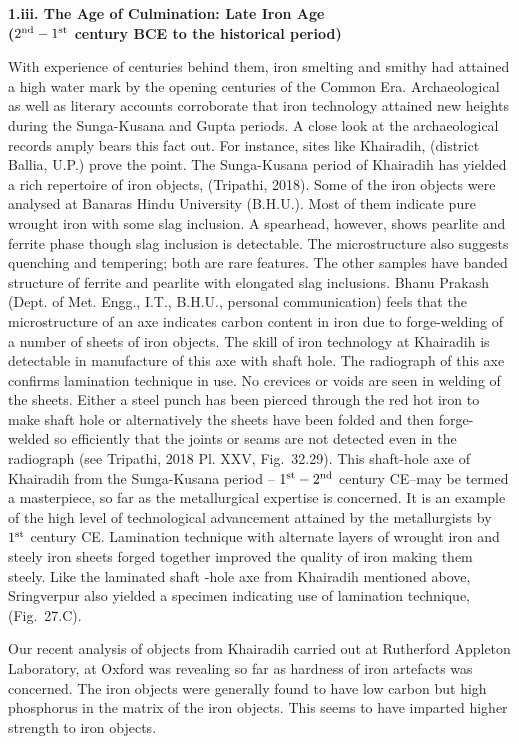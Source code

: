 \textbf{\large 1.iii. The Age of Culmination: Late Iron Age\\ ($2^{\rm nd} -1^{\rm st}$ century BCE to the historical period)}

With experience of centuries behind them, iron smelting and smithy had attained a high water mark by the opening centuries of the Common Era. Archaeological as well as literary accounts corroborate that iron technology attained new heights during the Sunga-Kusana and Gupta periods. A close look at the archaeological records amply bears this fact out. For instance, sites like Khairadih, (district Ballia, U.P.) prove the point. The Sunga-Kusana period of Khairadih has yielded a rich repertoire of iron objects, (Tripathi, 2018). Some of the iron objects were analysed at Banaras Hindu University (B.H.U.). Most of them indicate pure wrought iron with some slag inclusion. A spearhead, however, shows pearlite and ferrite phase though slag inclusion is detectable. The microstructure also suggests quenching and tempering; both are rare features. The other samples have banded structure of ferrite and pearlite with elongated slag inclusions. Bhanu Prakash (Dept. of Met. Engg., I.T., B.H.U., personal communication) feels that the microstructure of an axe indicates carbon content in iron due to forge-welding of a number of sheets of iron objects. The skill of iron technology at Khairadih is detectable in manufacture of this axe with shaft hole. The radiograph of this axe confirms lamination technique in use. No crevices or voids are seen in welding of the sheets. Either a steel punch has been pierced through the red hot iron to make shaft hole or alternatively the sheets have been folded and then forge-welded so efficiently that the joints or seams are not detected even in the radiograph (see Tripathi, 2018 Pl. XXV, Fig.~32.29). This shaft-hole axe of Khairadih from the Sunga-Kusana period – $1^{\rm st}  -2^{\rm nd}$ century CE–may be termed a masterpiece, so far as the metallurgical expertise is concerned. It is an example of the high level of technological advancement attained by the metallurgists by $1^{\rm st}$ century CE. Lamination technique with alternate layers of wrought iron and steely iron sheets forged together improved the quality of iron making them steely. Like the laminated shaft -hole axe from Khairadih mentioned above, Sringverpur also yielded a specimen indicating use of lamination technique, (Fig.~27.C).

Our recent analysis of objects from Khairadih carried out at Rutherford Appleton Laboratory, at Oxford was revealing so far as hardness of iron artefacts was concerned. The iron objects were generally found to have low carbon but high phosphorus in the matrix of the iron objects. This seems to have imparted higher strength to iron objects.  

